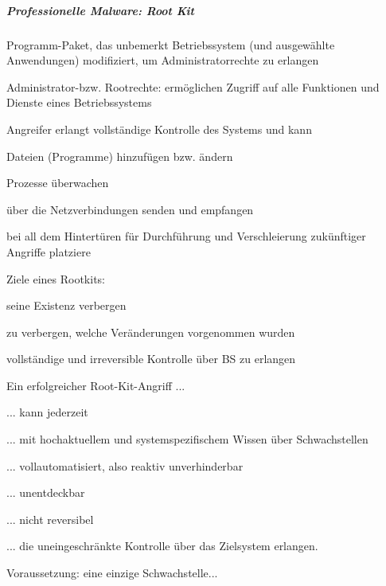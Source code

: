 \documentclass[a4paper]{article}
\begin{document}
\begin{multicols}{3}
    \subparagraph{Professionelle Malware: Root
        Kit}

    \begin{itemize*}
        \item
        Programm-Paket, das unbemerkt Betriebssystem (und ausgewählte
        Anwendungen) modifiziert, um Administratorrechte zu erlangen
        \begin{itemize*}
            \item Administrator-bzw. Rootrechte: ermöglichen Zugriff auf alle Funktionen und Dienste eines Betriebssystems
            \item Angreifer erlangt vollständige Kontrolle des Systems und kann \begin{itemize*} \item Dateien (Programme) hinzufügen bzw. ändern \item Prozesse überwachen \item über die Netzverbindungen senden und empfangen \item bei all dem Hintertüren für Durchführung und Verschleierung zukünftiger Angriffe platziere \end{itemize*}
            \item Ziele eines Rootkits: \begin{itemize*} \item seine Existenz verbergen \item zu verbergen, welche Veränderungen vorgenommen wurden \item vollständige und irreversible Kontrolle über BS zu erlangen \end{itemize*}
        \end{itemize*}
        \item
        Ein erfolgreicher Root-Kit-Angriff ...
        \begin{itemize*}
            \item ... kann jederzeit
            \item ... mit hochaktuellem und systemspezifischem Wissen über Schwachstellen
            \item ... vollautomatisiert, also reaktiv unverhinderbar
            \item ... unentdeckbar
            \item ... nicht reversibel
            \item ... die uneingeschränkte Kontrolle über das Zielsystem erlangen.
        \end{itemize*}
        \item
        Voraussetzung: eine einzige Schwachstelle...
    \end{itemize*}



\end{multicols}
\end{document}
